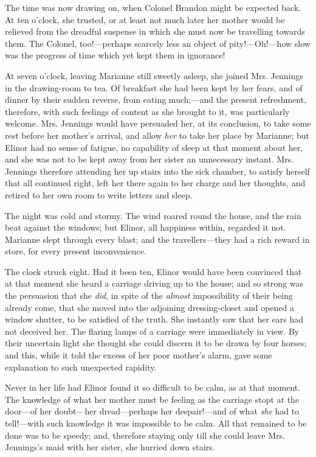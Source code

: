 The time was now drawing on, when Colonel Brandon might be expected back. At ten o'clock, she trusted, or at least not much later her mother would be relieved from the dreadful suspense in which she must now be travelling towards them. The Colonel, too!---perhaps scarcely less an object of pity!---Oh!---how slow was the progress of time which yet kept them in ignorance!

At seven o'clock, leaving Marianne still sweetly asleep, she joined Mrs. Jennings in the drawing-room to tea. Of breakfast she had been kept by her fears, and of dinner by their sudden reverse, from eating much;---and the present refreshment, therefore, with such feelings of content as she brought to it, was particularly welcome. Mrs. Jennings would have persuaded her, at its conclusion, to take some rest before her mother's arrival, and allow {\em her} to take her place by Marianne; but Elinor had no sense of fatigue, no capability of sleep at that moment about her, and she was not to be kept away from her sister an unnecessary instant. Mrs. Jennings therefore attending her up stairs into the sick chamber, to satisfy herself that all continued right, left her there again to her charge and her thoughts, and retired to her own room to write letters and sleep.

The night was cold and stormy. The wind roared round the house, and the rain beat against the windows; but Elinor, all happiness within, regarded it not. Marianne slept through every blast; and the travellers---they had a rich reward in store, for every present inconvenience.

The clock struck eight. Had it been ten, Elinor would have been convinced that at that moment she heard a carriage driving up to the house; and so strong was the persuasion that she {\em did}, in spite of the {\em almost} impossibility of their being already come, that she moved into the adjoining dressing-closet and opened a window shutter, to be satisfied of the truth. She instantly saw that her ears had not deceived her. The flaring lamps of a carriage were immediately in view. By their uncertain light she thought she could discern it to be drawn by four horses; and this, while it told the excess of her poor mother's alarm, gave some explanation to such unexpected rapidity.

Never in her life had Elinor found it so difficult to be calm, as at that moment. The knowledge of what her mother must be feeling as the carriage stopt at the door---of her doubt---her dread---perhaps her despair!---and of what {\em she} had to tell!---with such knowledge it was impossible to be calm. All that remained to be done was to be speedy; and, therefore staying only till she could leave Mrs. Jennings's maid with her sister, she hurried down stairs.

